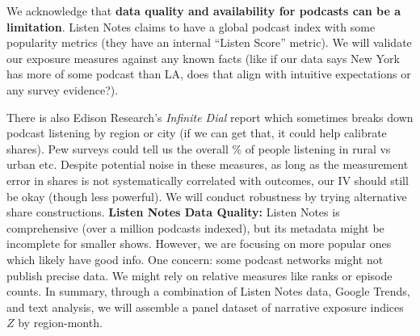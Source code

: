 \documentclass[12pt]{article}
\begin{document}
We acknowledge that \textbf{data quality and availability for podcasts can be a limitation}. Listen Notes claims to have a global podcast index with some popularity metrics (they have an internal ``Listen Score'' metric). We will validate our exposure measures against any known facts (like if our data says New York has more of some podcast than LA, does that align with intuitive expectations or any survey evidence?).

There is also Edison Research's \emph{Infinite Dial} report which sometimes breaks down podcast listening by region or city (if we can get that, it could help calibrate shares). Pew surveys could tell us the overall \% of people listening in rural vs urban etc.
Despite potential noise in these measures, as long as the measurement error in shares is not systematically correlated with outcomes, our IV should still be okay (though less powerful). We will conduct robustness by trying alternative share constructions.
\textbf{Listen Notes Data Quality:} Listen Notes is comprehensive (over a million podcasts indexed), but its metadata might be incomplete for smaller shows. However, we are focusing on more popular ones which likely have good info. One concern: some podcast networks might not publish precise data. We might rely on relative measures like ranks or episode counts.
In summary, through a combination of Listen Notes data, Google Trends, and text analysis, we will assemble a panel dataset of narrative exposure indices $Z$ by region-month.
\end{document}
